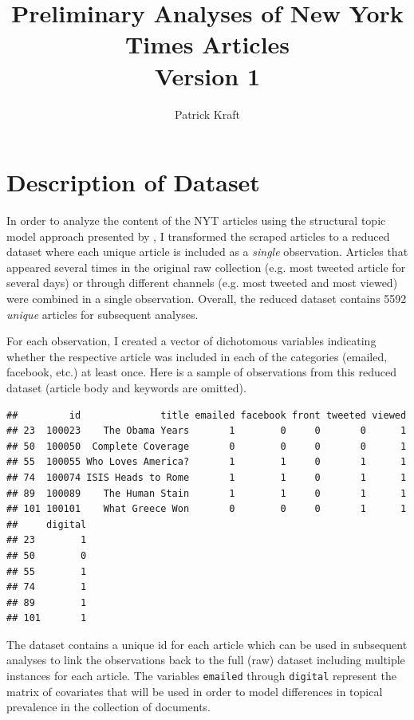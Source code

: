 \documentclass[12pt]{article}\usepackage[]{graphicx}\usepackage[]{color}
\title{Preliminary Analyses of New York Times Articles\\\large{Version 1}}
\author{Patrick Kraft}
\makeatletter
\newenvironment{kframe}{%
 \def\at@end@of@kframe{}%
 \ifinner\ifhmode%
  \def\at@end@of@kframe{\end{minipage}}%
  \begin{minipage}{\columnwidth}%
 \fi\fi%
 \def\FrameCommand##1{\hskip\@totalleftmargin \hskip-\fboxsep
 \colorbox{shadecolor}{##1}\hskip-\fboxsep
     \hskip-\linewidth \hskip-\@totalleftmargin \hskip\columnwidth}%
 \MakeFramed {\advance\hsize-\width
   \@totalleftmargin\z@ \linewidth\hsize
   \@setminipage}}%
 {\par\unskip\endMakeFramed%
 \at@end@of@kframe}
\newenvironment{knitrout}{}{} %
\makeatother
\begin{document}
\maketitle



\section{Description of Dataset}

In order to analyze the content of the NYT articles using the structural topic model approach presented by \citet{roberts2014structural}, I transformed the scraped articles to a reduced dataset where each unique article is included as a \textit{single} observation. Articles that appeared several times in the original raw collection (e.g. most tweeted article for several days) or through different channels (e.g. most tweeted and most viewed) were combined in a single observation. Overall, the reduced dataset contains 5592 \textit{unique} articles for subsequent analyses.

For each observation, I created a vector of dichotomous variables indicating whether the respective article was included in each of the categories (emailed, facebook, etc.) at least once. Here is a sample of observations from this reduced dataset (article body and keywords are omitted).

\begin{knitrout}
\color{fgcolor}\begin{kframe}
\begin{verbatim}
##         id              title emailed facebook front tweeted viewed
## 23  100023    The Obama Years       1        0     0       0      1
## 50  100050  Complete Coverage       0        0     0       0      1
## 55  100055 Who Loves America?       1        1     0       1      1
## 74  100074 ISIS Heads to Rome       1        1     0       1      1
## 89  100089    The Human Stain       1        1     0       1      1
## 101 100101    What Greece Won       0        0     0       1      1
##     digital
## 23        1
## 50        0
## 55        1
## 74        1
## 89        1
## 101       1
\end{verbatim}
\end{kframe}
\end{knitrout}

The dataset contains a unique id for each article which can be used in subsequent analyses to link the observations back to the full (raw) dataset including multiple instances for each article. The variables \texttt{emailed} through \texttt{digital} represent the matrix of covariates that will be used in order to model differences in topical prevalence in the collection of documents.
\end{document}
